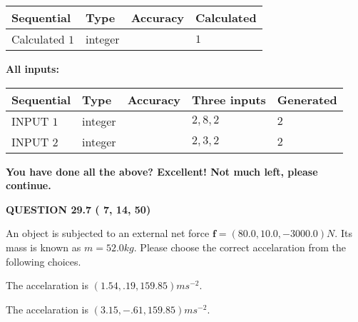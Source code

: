 \documentclass[12pt]{article}
\begin{document}
   
   
   
\noindent{}
   
   
  
  
\noindent\begin{tabular}{|l|l|l|l|}
\hline
 Sequential & Type & Accuracy & Calculated \\ 
\hline
 
 
  Calculated $           1$ & integer &  & 
  $ 1 $ 
 \\  \hline  
 \end{tabular}
   
   
   
   
\noindent\vspace{0.1in}\hspace{-0.08in} {\textbf{\Large{All inputs: }}}
   
   
  
  
\noindent\begin{tabular}{|l|l|l|l|l|}
\hline
 Sequential & Type & Accuracy & Three inputs & Generated \\ 
\hline
 
 
  INPUT $           1$ & integer &  & $
 2
 , 
 8
 , 
 2
 $ & $ 2 $ 
 \\  \hline  
 
 
  INPUT $           2$ & integer &  & $
 2
 , 
 3
 , 
 2
 $ & $ 2 $ 
 \\  \hline  
 \end{tabular}
   
   
   
   
\vspace{0.3in}
{\textbf{\LARGE{You have done all the above? Excellent! Not much left, please continue.}}}
\vspace{0.3in}
   
   
  
\vspace{0.2in}
  
{\textbf{\Large{QUESTION
29.7 
 (          7,         14,         50)
}}}
  
  
 
An object is subjected to an external net force $\mathbf{f}=
(80.0 , 10.0 , -3000.0) N$.
Its mass is known as $m= %
52.0 kg$.
Please choose the correct accelaration from the following choices.
 
 
  The accelaration is $  %
(
1.54,
.19,
159.85)
ms^{-2} $.
 
 
  The accelaration is $  %
(
3.15,
-.61,
159.85)
ms^{-2} $.
 
\end{document}
